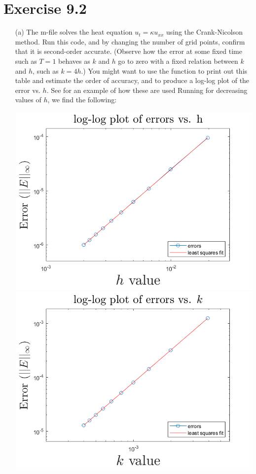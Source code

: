 \documentclass{article}
\begin{document}
\section*{Exercise 9.2}
\begin{itemize}
    \item[(a)] The m-file   solves the heat equation $u_t = \kappa u_{xx}$ using the Crank-Nicolson method. Run this code, and by changing the number of grid points, confirm that it is second-order accurate. (Observe how the error at some fixed time such as $T = 1$ behaves as $k$ and $h$ go to zero with a fixed relation between $k$ and $h$, such as $k = 4h$.)
    \newline
    You might want to use the function  to print out this table and estimate the order of accuracy, and  to produce a log-log plot of the error vs. $h$. See  for an example of how these are used
    \newline\newline
    Running  for decreasing values of $h$, we find the following:
    \begin{center}
        \includegraphics[scale = 0.4]{crankNicolsonerrGraph.png}
        \includegraphics[scale = 0.4]{cnorderk.png}

\end{center}
\end{itemize}
\end{document}
